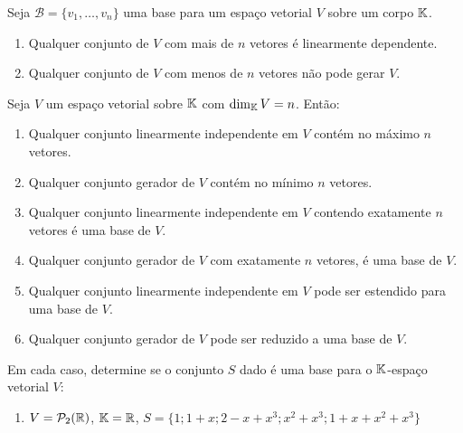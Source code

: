 \begin{exemplos}
\begin{teorema}
  Seja $\mathcal{B} = \{v_1, \dots, v_n\}$ uma base para um espaço vetorial $V$ sobre um corpo $\mathbb{K}$. 
  \begin{enumerate}[label={\roman*})]
    \item Qualquer conjunto de $V$ com mais de $n$ vetores é linearmente dependente. 

    \item Qualquer conjunto de $V$ com menos de $n$ vetores não pode gerar $V$.
  \end{enumerate}
\end{teorema}

\begin{teorema}\label{ResumoLDLI}
  Seja $V$ um espaço vetorial sobre $\mathbb{K}$ com $\dim_{\mathbb{K}} V = n$. Então: 
  \begin{enumerate}[label={\roman*})]
    \item\label{maximoLI} Qualquer conjunto linearmente independente em $V$ contém no máximo $n$ vetores. 
        
    \item\label{minimogerador} Qualquer conjunto gerador de $V$ contém no mínimo $n$ vetores. 
        
    \item\label{LIbase} Qualquer conjunto linearmente independente em $V$ contendo exatamente $n$ vetores é uma base de $V$. 
      
    \item\label{geraBase} Qualquer conjunto gerador de $V$ com exatamente $n$ vetores, é uma base de $V$. 
        
    \item Qualquer conjunto linearmente independente em $V$ pode ser estendido para uma base de $V$. 
        
    \item Qualquer conjunto gerador de $V$ pode ser reduzido a uma base de $V$. 
  \end{enumerate}
\end{teorema}

\begin{exemplos}
  Em cada caso, determine se o conjunto $S$ dado é uma base para o $\mathbb{K}$-espaço vetorial $V$:
  \begin{enumerate}
    \item $V = \mathcal{P}_2(\mathbb{R})$, $\mathbb{K} = \mathbb{R}$, $S = \{1; 1 + x; 2 - x + x^3; x^2 + x^3; 1 + x + x^2 + x^3\}$


\end{enumerate}
\end{exemplos}
\end{exemplos}
